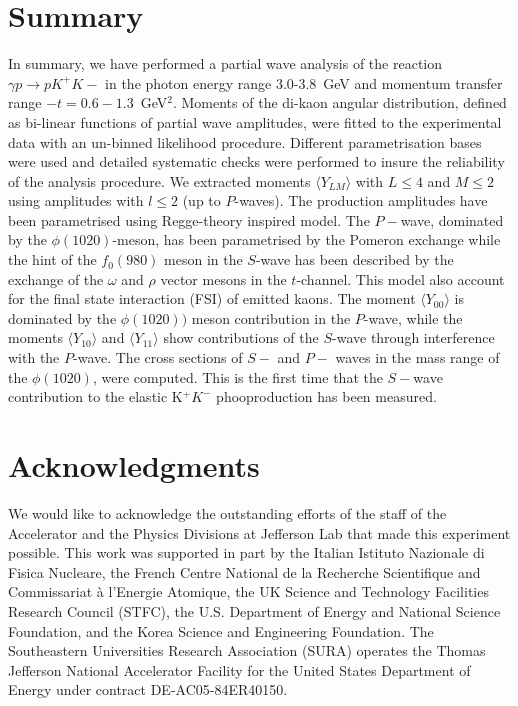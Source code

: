 \documentclass[twocolumn,superscriptaddress,prd]{revtex4}
\begin{document}
\section{\label{sec:sum} Summary}
In summary, we have performed a partial wave analysis of the reaction  $\gamma p \to p K^+ K-$ in the photon energy range 3.0-3.8~GeV
and momentum transfer range $-t=0.6-1.3$~GeV$^2$. Moments of the di-kaon angular distribution, defined as bi-linear functions of partial wave amplitudes,
were fitted to the experimental data with an un-binned likelihood procedure. Different parametrisation bases were used and detailed systematic checks 
were performed to insure the reliability of the analysis procedure. We extracted moments $\langle Y_{LM}\rangle$ with $L \le 4$ and $M \le 2$ using amplitudes with $l \le 2$ (up to $P$-waves). 
The production amplitudes have been parametrised using Regge-theory inspired model. The $P-$wave, dominated by the $\phi(1020)$-meson, has been parametrised by the Pomeron exchange while the hint of the $f_0(980)$ meson  in the  $S$-wave has been described by the exchange of the $\omega$ and $\rho$ vector mesons in the $t$-channel. This model also account for the final state interaction (FSI) of  emitted kaons. 
The moment $\langle Y_{00} \rangle$ is dominated by the $\phi(1020))$ meson contribution in the $P$-wave,
while the moments $\langle Y_{10} \rangle$ and $\langle Y_{11} \rangle$  show  contributions of the $S$-wave  through 
interference with the $P$-wave. The cross sections of $S-$ and $P-$ waves in the mass range of the $\phi(1020)$,  were 
computed. This is the first time that the $S-$wave contribution to the elastic K$^+$$K^-$ phooproduction has been measured.


\section{\label{sec:ack} Acknowledgments}
We would like to acknowledge the outstanding efforts of the staff of the Accelerator
and the Physics Divisions at Jefferson Lab that made this experiment possible. 
This work was supported in part by  the  Italian Istituto Nazionale di Fisica Nucleare, 
the French Centre National de la Recherche Scientifique
and Commissariat \`a l'Energie Atomique, the UK Science and Technology Facilities Research Council (STFC),
the U.S. Department of Energy and National Science Foundation, 
and the Korea Science and Engineering Foundation.
The Southeastern Universities Research Association (SURA) operates the
Thomas Jefferson National Accelerator Facility for the United States
Department of Energy under contract DE-AC05-84ER40150.
\end{document}
